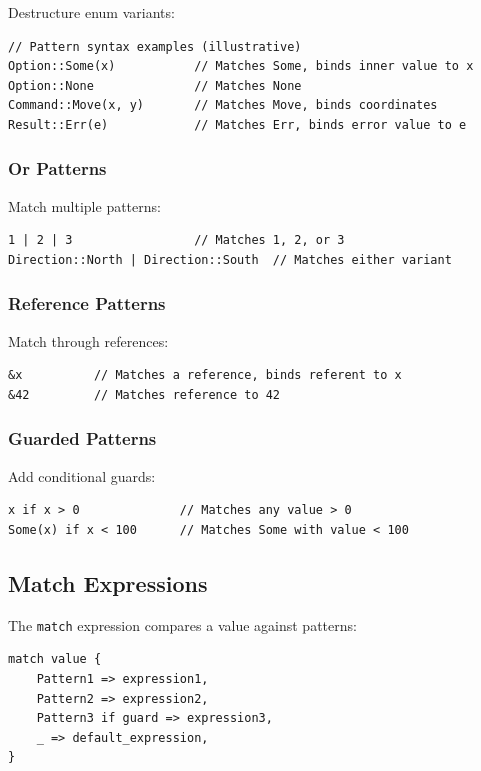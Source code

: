 Destructure enum variants:

\begin{lstlisting}
// Pattern syntax examples (illustrative)
Option::Some(x)           // Matches Some, binds inner value to x
Option::None              // Matches None
Command::Move(x, y)       // Matches Move, binds coordinates
Result::Err(e)            // Matches Err, binds error value to e
\end{lstlisting}

\subsubsection{Or Patterns}

Match multiple patterns:

\begin{lstlisting}
1 | 2 | 3                 // Matches 1, 2, or 3
Direction::North | Direction::South  // Matches either variant
\end{lstlisting}

\subsubsection{Reference Patterns}

Match through references:

\begin{lstlisting}
&x          // Matches a reference, binds referent to x
&42         // Matches reference to 42
\end{lstlisting}

\subsubsection{Guarded Patterns}

Add conditional guards:

\begin{lstlisting}
x if x > 0              // Matches any value > 0
Some(x) if x < 100      // Matches Some with value < 100
\end{lstlisting}

\subsection{Match Expressions}

The \texttt{match} expression compares a value against patterns:

\begin{lstlisting}
match value {
    Pattern1 => expression1,
    Pattern2 => expression2,
    Pattern3 if guard => expression3,
    _ => default_expression,
}
\end{lstlisting}

